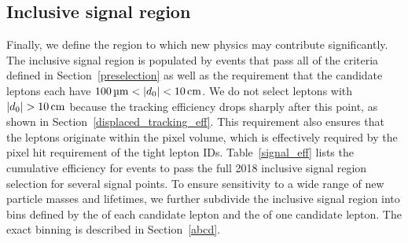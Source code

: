 



\subsection{Inclusive signal region}
Finally, we define the region to which new physics may contribute significantly. The inclusive signal region is populated by events that pass all of the criteria defined in Section~\ref{preselection} as well as the requirement that the candidate leptons each have $\SI{100}{\um}<\ad<\SI{10}{\cm}$. We do not select leptons with $\ad>\SI{10}{\cm}$ because the tracking efficiency drops sharply after this point, as shown in Section~\ref{displaced_tracking_eff}. This requirement also ensures that the leptons originate within the pixel volume, which is effectively required by the pixel hit requirement of the tight lepton IDs. Table~\ref{signal_eff} lists the cumulative efficiency for \stoptolb events to pass the full 2018 inclusive signal region selection for several signal points. To ensure sensitivity to a wide range of new particle masses and lifetimes, we further subdivide the inclusive signal region into bins defined by the \ad of each candidate lepton and the \pt of one candidate lepton. The exact binning is described in Section~\ref{abcd}.



\pagebreak